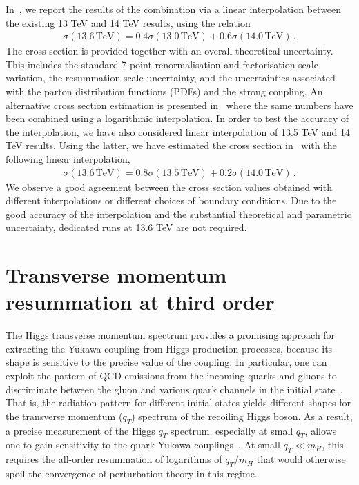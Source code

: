 \documentclass[11pt,a4paper]{article}
\begin{document}
In~, we report the results of the \nlonnllpart{} combination via a linear interpolation between the existing 13 TeV and 14 TeV results, using the relation
\begin{align}
\sigma(13.6\,\text{TeV})=0.4\sigma(13.0\,\text{TeV})+0.6\sigma(14.0\,\text{TeV})\,.
\end{align}
The cross section is provided together with an overall theoretical uncertainty. This includes the standard 7-point renormalisation and factorisation scale variation, the resummation scale uncertainty, and the uncertainties associated with the parton distribution functions (PDFs) and the strong coupling. An alternative cross section estimation is presented in~ where the same numbers have been combined using a logarithmic interpolation. In order to test the accuracy of the interpolation, we have also considered linear interpolation of 13.5 TeV and 14 TeV results. Using the latter, we have estimated the cross section in~ with the following linear interpolation,
\begin{align}
	\sigma(13.6\,\text{TeV})=0.8\sigma(13.5\,\text{TeV})+0.2\sigma(14.0\,\text{TeV})\,.
\end{align}
We observe a good agreement between the cross section values obtained with different interpolations or different choices of boundary conditions. Due to the good accuracy of the interpolation and the substantial theoretical and parametric uncertainty, dedicated runs at 13.6 TeV are not required.

\section{Transverse momentum resummation at third order}
\label{sec:resummation}
The Higgs transverse momentum spectrum provides a promising approach for extracting the Yukawa coupling from Higgs production processes, because its shape is sensitive to the precise value of the coupling.
In particular, one can exploit the pattern of QCD emissions from the incoming quarks and gluons to discriminate between the gluon and various quark channels in the initial state~\cite{Ebert:2016idf}.
That is, the radiation pattern for different initial states yields different shapes for the transverse momentum ($q_T$) spectrum of the recoiling Higgs boson. As a result, a precise measurement of the Higgs $q_T$ spectrum, especially at small $q_T$, allows one to gain sensitivity to the quark Yukawa couplings~\cite{Bishara:2016jga, Soreq:2016rae}.
At small $q_T \ll m_H$, this requires the all-order resummation of logarithms of $q_T/m_H$ that would otherwise spoil the convergence of perturbation theory in this regime.
\end{document}
